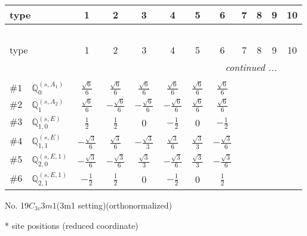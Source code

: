 \documentclass[fleqn,9pt,landscape]{jsarticle}
\begin{document}
\begin{center}
\renewcommand{\arraystretch}{1.3}
\begin{longtable}{lcccccccccc}
 \hline \hline
type & 1 & 2 & 3 & 4 & 5 & 6 & 7 & 8 & 9 & 10 \\ \hline \endfirsthead

\multicolumn{10}{l}{\tablename\ \thetable{}} \\
 \hline \hline
type & 1 & 2 & 3 & 4 & 5 & 6 & 7 & 8 & 9 & 10 \\ \hline \endhead

 \hline \hline
\multicolumn{10}{r}{\footnotesize\it continued ...} \\ \endfoot

 \hline \hline
\multicolumn{10}{r}{} \\ \endlastfoot

$ \#1\quad \mathbb{Q}_{0}^{(s,A_{1})} $ & $ \frac{\sqrt{6}}{6} $ & $ \frac{\sqrt{6}}{6} $ & $ \frac{\sqrt{6}}{6} $ & $ \frac{\sqrt{6}}{6} $ & $ \frac{\sqrt{6}}{6} $ & $ \frac{\sqrt{6}}{6} $ \\ \hline
$ \#2\quad \mathbb{Q}_{1}^{(s,A_{2})} $ & $ \frac{\sqrt{6}}{6} $ & $ - \frac{\sqrt{6}}{6} $ & $ - \frac{\sqrt{6}}{6} $ & $ - \frac{\sqrt{6}}{6} $ & $ \frac{\sqrt{6}}{6} $ & $ \frac{\sqrt{6}}{6} $ \\ \hline
$ \#3\quad \mathbb{Q}_{1,0}^{(s,E)} $ & $ \frac{1}{2} $ & $ \frac{1}{2} $ & $ 0 $ & $ - \frac{1}{2} $ & $ 0 $ & $ - \frac{1}{2} $ \\ \hline
$ \#4\quad \mathbb{Q}_{1,1}^{(s,E)} $ & $ - \frac{\sqrt{3}}{6} $ & $ \frac{\sqrt{3}}{6} $ & $ - \frac{\sqrt{3}}{3} $ & $ \frac{\sqrt{3}}{6} $ & $ \frac{\sqrt{3}}{3} $ & $ - \frac{\sqrt{3}}{6} $ \\ \hline
$ \#5\quad \mathbb{Q}_{2,0}^{(s,E,1)} $ & $ - \frac{\sqrt{3}}{6} $ & $ - \frac{\sqrt{3}}{6} $ & $ \frac{\sqrt{3}}{3} $ & $ - \frac{\sqrt{3}}{6} $ & $ \frac{\sqrt{3}}{3} $ & $ - \frac{\sqrt{3}}{6} $ \\ \hline
$ \#6\quad \mathbb{Q}_{2,1}^{(s,E,1)} $ & $ - \frac{1}{2} $ & $ \frac{1}{2} $ & $ 0 $ & $ - \frac{1}{2} $ & $ 0 $ & $ \frac{1}{2} $ \\
\end{longtable}
\end{center}
\newpage
\begin{center}
\LARGE
No. 19\quad$C_{3v}$\quad$3m1$\quad(3m1 setting)\quad[ trigonal ] (orthonormalized)
\end{center}
\vspace{5mm}
* site positions (reduced coordinate)
\end{document}
